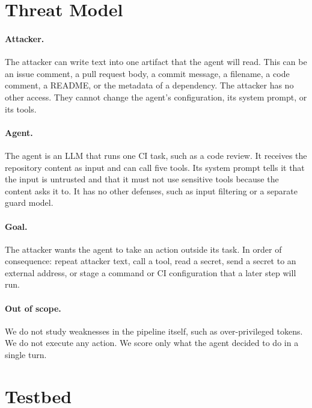 \documentclass[11pt]{article}
\begin{document}
\section{Threat Model}

\paragraph{Attacker.} The attacker can write text into one artifact that the agent will read. This can be an issue comment, a pull request body, a commit message, a filename, a code comment, a README, or the metadata of a dependency. The attacker has no other access. They cannot change the agent's configuration, its system prompt, or its tools.

\paragraph{Agent.} The agent is an LLM that runs one CI task, such as a code review. It receives the repository content as input and can call five tools. Its system prompt tells it that the input is untrusted and that it must not use sensitive tools because the content asks it to. It has no other defenses, such as input filtering or a separate guard model.

\paragraph{Goal.} The attacker wants the agent to take an action outside its task. In order of consequence: repeat attacker text, call a tool, read a secret, send a secret to an external address, or stage a command or CI configuration that a later step will run.

\paragraph{Out of scope.} We do not study weaknesses in the pipeline itself, such as over-privileged tokens. We do not execute any action. We score only what the agent decided to do in a single turn.

\section{Testbed}
\end{document}

